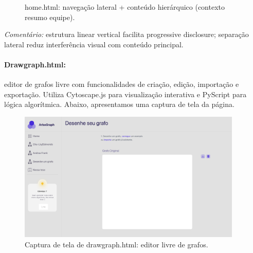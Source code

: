 \documentclass[12pt,a4paper]{article}
\def\texttt#1{#1}%
\def\emph#1{#1}%
\def\_{}%
\begin{document}
\begin{figure}[H]\centering
    \caption{\texttt{home.html}: navegação lateral + conteúdo hierárquico (contexto \textrightarrow resumo \textrightarrow equipe).}
\end{figure}
\textit{Comentário:} estrutura linear vertical facilita \emph{progressive disclosure}; separação lateral reduz interferência visual com conteúdo principal.

\paragraph{\texttt{Draw\_graph.html}:} editor de grafos livre com funcionalidades de criação, edição, importação e exportação. Utiliza \texttt{Cytoscape.js} para visualização interativa e \texttt{PyScript} para lógica algorítmica. Abaixo, apresentamos uma captura de tela da página.

\begin{figure}[H]\centering
    \includegraphics[width=0.95\textwidth]{../assets/drawhtml.png}
    \caption{Captura de tela de \texttt{draw\_graph.html}: editor livre de grafos.}
    \label{fig:draw_html_screenshot}
\end{figure}
\end{document}
